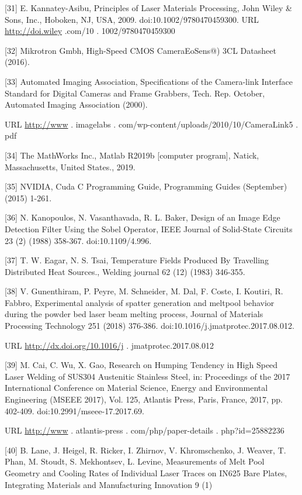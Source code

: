 \documentclass[10pt]{article}
\begin{document}
[31] E. Kannatey-Asibu, Principles of Laser Materials Processing, John Wiley \& Sons, Inc., Hoboken, NJ, USA, 2009. doi:10.1002/9780470459300. URL \href{http://doi.wiley}{http://doi.wiley} .com/10 . 1002/9780470459300

[32] Mikrotron Gmbh, High-Speed CMOS CameraEoSens@) 3CL Datasheet (2016).

[33] Automated Imaging Association, Specifications of the Camera-link Interface Standard for Digital Cameras and Frame Grabbers, Tech. Rep. October, Automated Imaging Association (2000).

URL \href{http://www}{http://www} . imagelabs . com/wp-content/uploads/2010/10/CameraLink5 . pdf

[34] The MathWorks Inc., Matlab R2019b [computer program], Natick, Massachusetts, United States., 2019.

[35] NVIDIA, Cuda C Programming Guide, Programming Guides (September) (2015) 1-261.

[36] N. Kanopoulos, N. Vasanthavada, R. L. Baker, Design of an Image Edge Detection Filter Using the Sobel Operator, IEEE Journal of Solid-State Circuits 23 (2) (1988) 358-367. doi:10.1109/4.996.

[37] T. W. Eagar, N. S. Tsai, Temperature Fields Produced By Travelling Distributed Heat Sources., Welding journal 62 (12) (1983) 346-355.

[38] V. Gunenthiram, P. Peyre, M. Schneider, M. Dal, F. Coste, I. Koutiri, R. Fabbro, Experimental analysis of spatter generation and meltpool behavior during the powder bed laser beam melting process, Journal of Materials Processing Technology 251 (2018) 376-386. doi:10.1016/j.jmatprotec.2017.08.012.

URL \href{http://dx.doi.org/10.1016/j}{http://dx.doi.org/10.1016/j} . jmatprotec.2017.08.012

[39] M. Cai, C. Wu, X. Gao, Research on Humping Tendency in High Speed Laser Welding of SUS304 Austenitic Stainless Steel, in: Proceedings of the 2017 International Conference on Material Science, Energy and Environmental Engineering (MSEEE 2017), Vol. 125, Atlantis Press, Paris, France, 2017, pp. 402-409. doi:10.2991/mseee-17.2017.69.

URL \href{http://www}{http://www} . atlantis-press . com/php/paper-details . php?id=25882236

[40] B. Lane, J. Heigel, R. Ricker, I. Zhirnov, V. Khromschenko, J. Weaver, T. Phan, M. Stoudt, S. Mekhontsev, L. Levine, Measurements of Melt Pool Geometry and Cooling Rates of Individual Laser Traces on IN625 Bare Plates, Integrating Materials and Manufacturing Innovation 9 (1)
\end{document}
